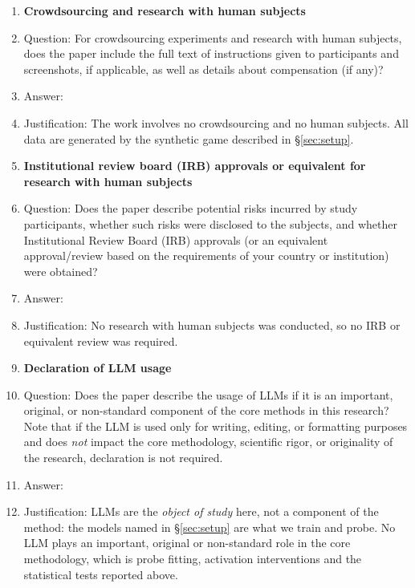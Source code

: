 \begin{enumerate}
\item {\bf Crowdsourcing and research with human subjects}
    \item[] Question: For crowdsourcing experiments and research with human subjects, does the paper include the full text of instructions given to participants and screenshots, if applicable, as well as details about compensation (if any)? 
    \item[] Answer: \answerNA{}
    \item[] Justification: The work involves no crowdsourcing and no human subjects. All data are generated by the synthetic game described in \S\ref{sec:setup}.
\item {\bf Institutional review board (IRB) approvals or equivalent for research with human subjects}
    \item[] Question: Does the paper describe potential risks incurred by study participants, whether such risks were disclosed to the subjects, and whether Institutional Review Board (IRB) approvals (or an equivalent approval/review based on the requirements of your country or institution) were obtained?
    \item[] Answer: \answerNA{}
    \item[] Justification: No research with human subjects was conducted, so no IRB or equivalent review was required.
\item {\bf Declaration of LLM usage}
    \item[] Question: Does the paper describe the usage of LLMs if it is an important, original, or non-standard component of the core methods in this research? Note that if the LLM is used only for writing, editing, or formatting purposes and does \emph{not} impact the core methodology, scientific rigor, or originality of the research, declaration is not required.
    \item[] Answer: \answerNA{}
    \item[] Justification: LLMs are the \emph{object of study} here, not a component of the method: the models named in \S\ref{sec:setup} are what we train and probe. No LLM plays an important, original or non-standard role in the core methodology, which is probe fitting, activation interventions and the statistical tests reported above.
\end{enumerate}